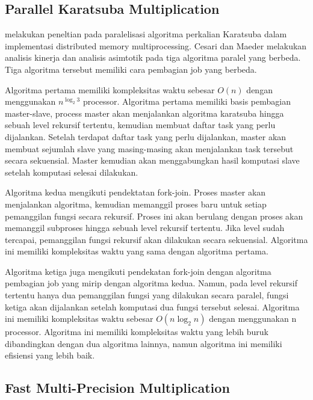 \subsection{Parallel Karatsuba Multiplication} \label{sec:parallel_karatsuba}
\citep{parallel_karatsuba_analysis} melakukan peneltian pada paralelisasi algoritma perkalian Karatsuba dalam implementasi distributed memory multiprocessing. Cesari dan Maeder melakukan analisis  kinerja dan analisis asimtotik pada tiga algoritma paralel yang berbeda. Tiga algoritma tersebut memiliki cara pembagian job yang berbeda.

Algoritma pertama memiliki kompleksitas waktu sebesar $O(n)$ dengan menggunakan $n^{\log_2 3}$ processor. Algoritma pertama memiliki basis pembagian master-slave, process master akan menjalankan algoritma karatsuba hingga sebuah level rekursif tertentu, kemudian membuat daftar task yang perlu dijalankan. Setelah terdapat daftar task yang perlu dijalankan, master akan membuat sejumlah slave yang masing-masing akan menjalankan task tersebut secara sekuensial. Master kemudian akan menggabungkan hasil komputasi slave setelah komputasi selesai dilakukan.

Algoritma kedua mengikuti pendektatan fork-join. Proses master akan menjalankan algoritma, kemudian memanggil proses baru untuk setiap pemanggilan fungsi secara rekursif. Proses ini akan berulang dengan proses akan memanggil subproses hingga sebuah level rekursif tertentu. Jika level sudah tercapai, pemanggilan fungsi rekursif akan dilakukan secara sekuensial. Algoritma ini memiliki kompleksitas waktu yang sama dengan algoritma pertama.

Algoritma ketiga juga mengikuti pendekatan fork-join dengan algoritma pembagian job yang mirip dengan algoritma kedua. Namun, pada level rekursif tertentu hanya dua pemanggilan fungsi yang dilakukan secara paralel, fungsi ketiga akan dijalankan setelah komputasi dua fungsi tersebut selesai. Algoritma ini memiliki kompleksitas waktu sebesar $O(n\log_2n)$ dengan menggunakan n processor. Algoritma ini memiliki kompleksitas waktu yang lebih buruk dibandingkan dengan dua algoritma lainnya, namun algoritma ini memiliki efisiensi yang lebih baik.


\subsection{Fast Multi-Precision Multiplication}
\citep{hutter_wenger_2018}



